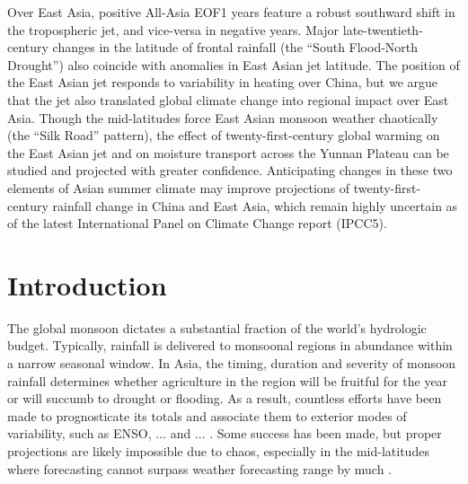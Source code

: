 Over East Asia, positive All-Asia EOF1 years feature a robust southward shift in the tropospheric jet, and vice-versa in negative years. Major late-twentieth-century changes in the latitude of frontal rainfall (the ``South Flood-North Drought'') also coincide with anomalies in East Asian jet latitude. The position of the East Asian jet responds to variability in heating over China, but we argue that the jet also translated global climate change into regional impact over East Asia. Though the mid-latitudes force East Asian monsoon weather chaotically (the ``Silk Road'' pattern), the effect of twenty-first-century global warming on the East Asian jet and on moisture transport across the Yunnan Plateau can be studied and projected with greater confidence. Anticipating changes in these two elements of Asian summer climate may improve projections of twenty-first-century rainfall change in China and East Asia, which remain highly uncertain as of the latest International Panel on Climate Change report (IPCC5).

\section{Introduction}


	The global monsoon dictates a substantial fraction of the world's hydrologic budget. Typically, rainfall is delivered to monsoonal regions in abundance within a narrow seasonal window. In Asia, the timing, duration and severity of monsoon rainfall determines whether agriculture in the region will be fruitful for the year or will succumb to drought or flooding. As a result, countless efforts have been made to prognosticate its totals and associate them to exterior modes of variability, such as ENSO, ... and ... . Some success has been made, but proper projections are likely impossible due to chaos, especially in the mid-latitudes where forecasting cannot surpass weather forecasting range by much \citep{Teng2013}.
	
